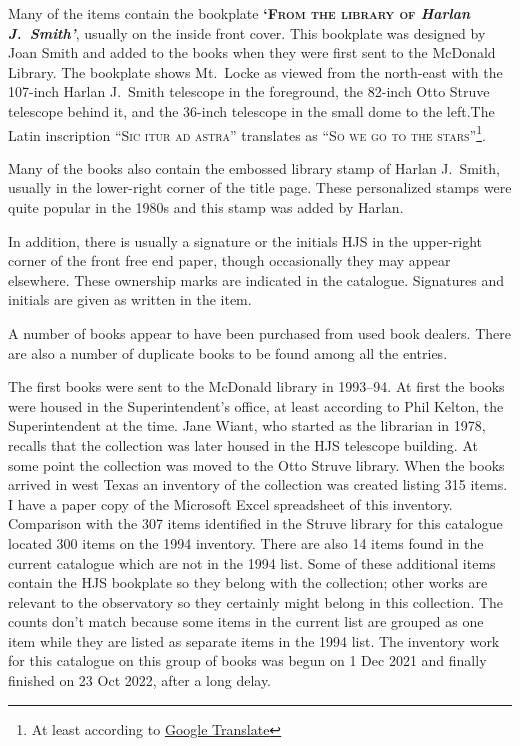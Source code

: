 Many of the items contain the bookplate {\bfseries\textsc{`From the
    library of} \textit{Harlan J.~Smith'}}, usually on the inside
front cover. This bookplate was designed by Joan Smith and added to
the books when they were first sent to the McDonald Library. The
bookplate shows Mt.~Locke as viewed from the north-east with the
107-inch Harlan J.~Smith telescope in the foreground, the 82-inch Otto
Struve telescope behind it, and the 36-inch telescope in the small
dome to the left.The Latin inscription \textsc{``Sic itur ad astra''}
translates as \textsc{``So we go to the stars''}\footnote{At least
according to \href{https://translate.google.com}{Google Translate}}.

Many of the books also contain the embossed library stamp of Harlan
J.~Smith, usually in the lower-right corner of the title page. These
personalized stamps were quite popular in the 1980s and this stamp was
added by Harlan.

In addition, there is usually a signature or the initials
HJS in the upper-right corner of the front free end paper, though
occasionally they may appear elsewhere.  These ownership marks are
indicated in the catalogue.  Signatures and initials are given as
written in the item.

A number of books appear to have been purchased from used book
dealers.  There are also a number of duplicate books to be found among
all the entries.

The first books were sent to the McDonald library in 1993--94. At
first the books were housed in the Superintendent's office, at least
according to Phil Kelton, the Superintendent at the time.  Jane Wiant,
who started as the librarian in 1978, recalls that the collection was
later housed in the HJS telescope building.  At some point the
collection was moved to the Otto Struve library.  When the books
arrived in west Texas an inventory of the collection was created
listing 315 items. I have a paper copy of the Microsoft Excel
spreadsheet of this inventory.  Comparison with the 307 items
identified in the Struve library for this catalogue located 300 items
on the 1994 inventory. There are also 14 items found in the current
catalogue which are not in the 1994 list. Some of these additional
items contain the HJS bookplate so they belong with the collection;
other works are relevant to the observatory so they certainly might
belong in this collection. The counts don't match because some items
in the current list are grouped as one item while they are listed as
separate items in the 1994 list.  The inventory work for this
catalogue on this group of books was begun on 1 Dec 2021 and finally
finished on 23 Oct 2022, after a long delay.

